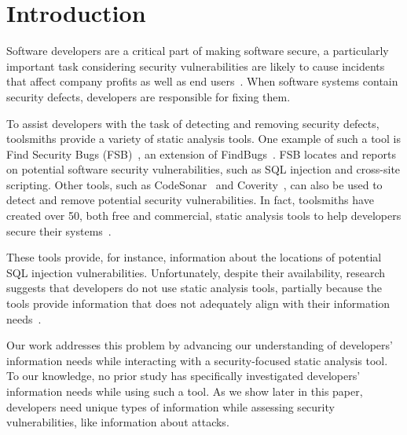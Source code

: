\documentclass{sig-alternate}
\begin{document}

\section{Introduction}

Software developers are a critical part of making software secure, a particularly important task considering security vulnerabilities are likely to cause incidents that affect company profits as well as end users~\cite{chen2002mops}.
When software systems contain security defects, developers are responsible for fixing them. 

To assist developers with the task of detecting and removing security defects, toolsmiths provide a variety of static analysis tools.
One example of such a tool is Find Security Bugs (FSB)~\cite{FindSecurityBugs}, an extension of FindBugs~\cite{FindBugs}.
FSB locates and reports on potential software security vulnerabilities, such as SQL injection and cross-site scripting.  
Other tools, such as CodeSonar~\cite{CodeSonar} and Coverity~\cite{Coverity}, can also be used to detect and remove potential security vulnerabilities.
In fact, toolsmiths have created over 50, both free and commercial, static analysis tools to help developers secure their systems~\cite{CodeAnalysis, OWASPSCA, SecurityAnalyzers}.

These tools provide, for instance, information about the locations of potential SQL injection vulnerabilities.
Unfortunately, despite their availability, research suggests that developers do not use static analysis tools, partially because the tools provide information that does not adequately align with their information needs~\cite{johnson2013don}. 

Our work addresses this problem by advancing our understanding of developers' information needs while interacting with a security-focused static analysis tool. 
To our knowledge, no prior study has specifically investigated developers' information needs while using such a tool. 
As we show later in this paper, developers need unique types of information while assessing security vulnerabilities, like information about attacks.
\end{document}
